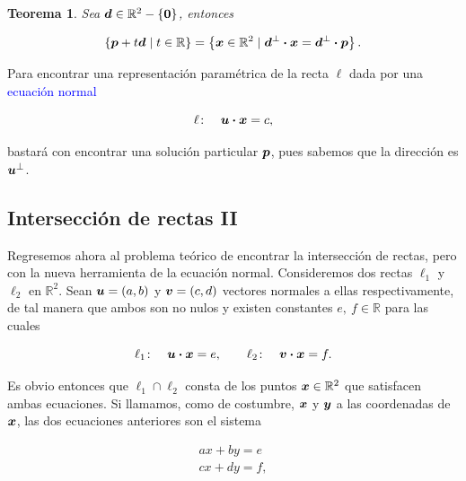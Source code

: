 \documentclass{article}
\theoremstyle{definicion}
\theoremstyle{definition}             %
\theoremstyle{definition}             %
\theoremstyle{definition}
\theoremstyle{definition}
\theoremstyle{observacion}
\theoremstyle{definition}
\theoremstyle{plain}
\newtheorem{theorem}{Teorema}
\theoremstyle{definition}
\theoremstyle{afirmacion}
\theoremstyle{notation}
\theoremstyle{definition}
\begin{document}
        \begin{theorem}
            Sea \(\vb*{d} \in \mathbb{R}^{2}-\{\vb*{0}\}\), entonces

            \begin{equation*}
                \left\lbrace\vb*{p} + t\vb*{d} \mid t \in \mathbb{R}\right\rbrace = \left\lbrace\vb*{x} \in \mathbb{R}^{2} \mid \vb*{d}^{\perp} \vdot \vb*{x} = \vb*{d}^{\perp} \vdot \vb*{p}\right\rbrace.
            \end{equation*}
        \end{theorem}

        Para encontrar una representación paramétrica de la recta \(\ell\) dada por una \textcolor{blue}{ecuación normal}

        \begin{equation*}
            \ell \colon \quad \vb*{u} \vdot \vb*{x} = c,
        \end{equation*}

        bastará con encontrar una solución particular \(\vb*{p}\), pues sabemos que la dirección es \(\vb*{u}^{\perp}\).

        \subsection{Intersección de rectas II}

        Regresemos ahora al problema teórico de encontrar la intersección de rectas, pero con la nueva herramienta de la ecuación normal. Consideremos dos rectas \(\ell_{1}\) y \(\ell_{2}\) en \(\mathbb{R}^{2}\). Sean \(\vb*{u} = (a, b)\) y \(\vb*{v} = (c, d)\) vectores normales a ellas respectivamente, de tal manera que ambos son no nulos y existen constantes \(e,\ f \in \mathbb{R}\) para las cuales

        \begin{equation*}
            \ell_{1} \colon\quad \vb*{u} \vdot \vb*{x} = e,\qquad \ell_{2} \colon\quad \vb*{v} \vdot \vb*{x} = f.
        \end{equation*}

        Es obvio entonces que \(\ell_{1} \cap \ell_{2}\) consta de los puntos \(\vb*{x} \in \mathbb{R}^{2}\) que satisfacen ambas ecuaciones. Si llamamos, como de costumbre, \(\vb*{x}\) y \(\vb*{y}\) a las coordenadas de \(\vb*{x}\), las dos ecuaciones anteriores son el sistema

        \begin{align*}
            ax + by = e \\
            cx + dy = f,
        \end{align*}
\end{document}
